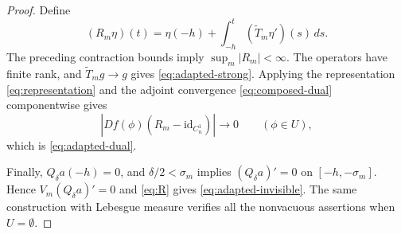 \documentclass[11pt]{article}
\newcommand{\id}{\mathrm{id}}
\begin{document}
\begin{proof}
Define
\begin{equation}\label{eq:R}
 (R_m\eta)(t)=\eta(-h)+\int_{-h}^t(\widetilde T_m\eta')(s)\,ds.
\end{equation}
The preceding contraction bounds imply $\sup_m|R_m|<\infty$. The operators have finite rank, and $\widetilde T_mg\to g$ gives \eqref{eq:adapted-strong}. Applying the representation \eqref{eq:representation} and the
adjoint convergence \eqref{eq:composed-dual} componentwise gives
\[
 |Df(\phi)(R_m-\id_{C_n^1})|\longrightarrow0
 \qquad(\phi\in U),
\]
which is \eqref{eq:adapted-dual}.

Finally, $Q_\delta a(-h)=0$, and $\delta/2<\sigma_m$ implies $(Q_\delta a)'=0$ on $[-h,-\sigma_m]$. Hence $V_m(Q_\delta a)'=0$ and \eqref{eq:R} gives \eqref{eq:adapted-invisible}. The same construction with Lebesgue measure verifies all the nonvacuous assertions when $U=\emptyset$.
\end{proof}
\end{document}
